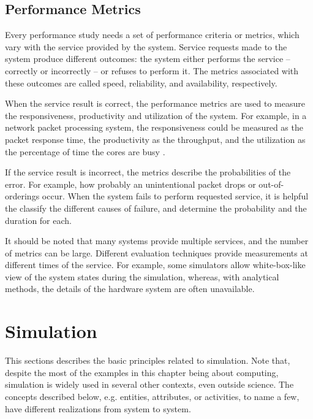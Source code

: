 \subsection{Performance Metrics}
Every performance study needs a set of performance criteria or metrics, which vary with the service provided by the system. Service requests made to the system produce different outcomes: the system either performs the service -- correctly or incorrectly -- or refuses to perform it. The metrics associated with these outcomes are called speed, reliability, and availability, respectively. \cite{jain:1991:AOCSPA}

When the service result is correct, the performance metrics are used to measure the responsiveness, productivity and utilization of the system. For example, in a network packet processing system, the responsiveness could be measured as the packet response time, the productivity as the throughput, and the utilization as the percentage of time the cores are busy \cite{Cavium FUNDAMENTALS}. \cite{jain:1991:AOCSPA}

If the service result is incorrect, the metrics describe the probabilities of the error. For example, how probably an unintentional packet drops or out-of-orderings occur. When the system fails to perform requested service, it is helpful the classify the different causes of failure, and determine the probability and the duration for each. \cite{jain:1991:AOCSPA}

It should be noted that many systems provide multiple services, and the number of metrics can be large. Different evaluation techniques provide measurements at different times of the service. For example, some simulators allow white-box-like view of the system states during the simulation, whereas, with analytical methods, the details of the hardware system are often unavailable. \cite{jain:1991:AOCSPA} \cite{TODO: find reference for the white-box black-box stuff}

\section{Simulation}
This sections describes the basic principles related to simulation. Note that, despite the most of the examples in this chapter being about computing, simulation is widely used in several other contexts, even outside science. The concepts described below, e.g. entities, attributes, or activities, to name a few, have different realizations from system to system.

